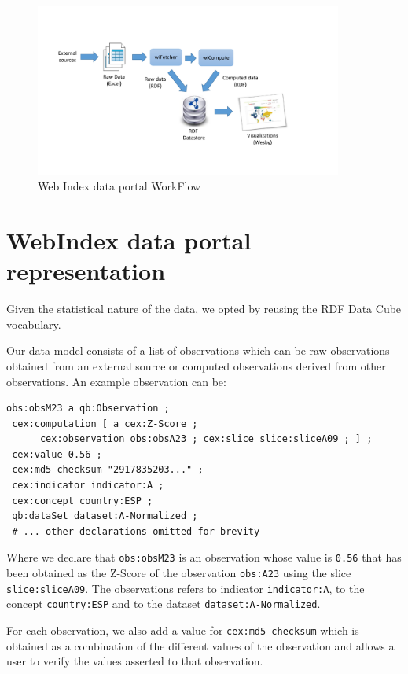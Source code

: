 \documentclass{acm_proc_article-sp}
\begin{document}
\begin{figure}[h]
\begin{center}
  \includegraphics[width=0.9\textwidth]{WebIndexWorkFlow}
\end{center}
\caption{Web Index data portal WorkFlow}
\label{Fig:WebIndexWorkFlow}
\end{figure}


\section{WebIndex data portal representation}

Given the statistical nature of the data, we opted by reusing the RDF Data Cube vocabulary. 
  
Our data model consists of a list of observations which can be raw observations
obtained from an external source or computed observations derived from other
observations. 
An example observation can be:

\begin{lstlisting}[style=SPARQL]
obs:obsM23 a qb:Observation ;
 cex:computation [ a cex:Z-Score ; 
      cex:observation obs:obsA23 ; cex:slice slice:sliceA09 ; ] ;
 cex:value 0.56 ;
 cex:md5-checksum "2917835203..." ;
 cex:indicator indicator:A ;
 cex:concept country:ESP ;
 qb:dataSet dataset:A-Normalized ;
 # ... other declarations omitted for brevity
\end{lstlisting}

Where we declare that \lstinline|obs:obsM23| is an observation
 whose value is \lstinline|0.56| that has been obtained as the Z-Score
 of the observation \lstinline|obs:A23| using the slice
 \lstinline|slice:sliceA09|. The observations refers to indicator
 \lstinline|indicator:A|, to the concept \lstinline|country:ESP| and to the
 dataset \lstinline|dataset:A-Normalized|.
 
For each observation, we also add a value for 
\lstinline|cex:md5-checksum| which is obtained as a combination of the 
different values of the observation and allows a user to verify the
values asserted to that observation.
\end{document}
